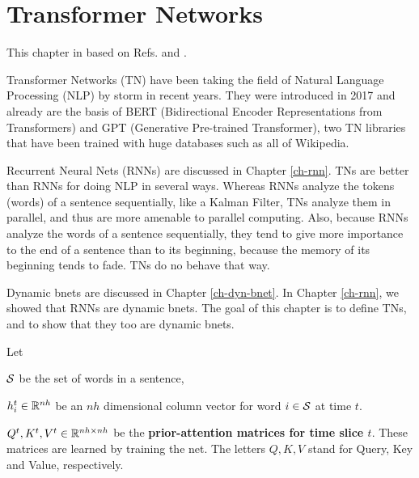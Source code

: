 \chapter{Transformer Networks}
\label{ch-transformer}

This chapter in based on Refs.\cite{joshi-trans}
and \cite{wiki-transformer}.

Transformer Networks (TN)
have been taking the field of
Natural Language Processing (NLP)
by storm in recent years.
They were introduced in 2017 and already
are the basis of
BERT (Bidirectional Encoder
Representations from Transformers)
and GPT (Generative Pre-trained Transformer),
two TN libraries that
have been trained with
huge databases such as all of Wikipedia.

Recurrent Neural Nets (RNNs)
are discussed in Chapter \ref{ch-rnn}.
TNs are better
than RNNs for doing NLP
in several ways.
Whereas RNNs
analyze the
tokens (words)
of
a sentence
sequentially,
like a Kalman Filter,
TNs
analyze them in parallel,
and thus
are more amenable
to parallel computing.
Also, because
RNNs
analyze the
words of a sentence sequentially,
they tend to give
more importance to the end
of a sentence 
than to its beginning,
because the memory of
its beginning tends to fade.
TNs do no behave that way.

Dynamic bnets are discussed in Chapter \ref{ch-dyn-bnet}.
In Chapter \ref{ch-rnn},
we showed that RNNs
are dynamic bnets.
The goal of
this chapter
is to define TNs,
and to show that they too are
dynamic bnets.

Let

${\cal S}$ be the
set of words in a sentence,

$h^t_i\in { \mathbb{R}}^{nh}$ be
an $nh$ dimensional column vector
for word $i\in {\cal S}$ at time $t$.

$Q^t, K^t, V^t\in { \mathbb{R}}^{nh\times nh}$
be the  {\bf prior-attention matrices for time
slice $t$}.
These matrices are learned by training
the net.
The letters $Q,K,V$ stand for
 Query, Key and Value,
respectively.



